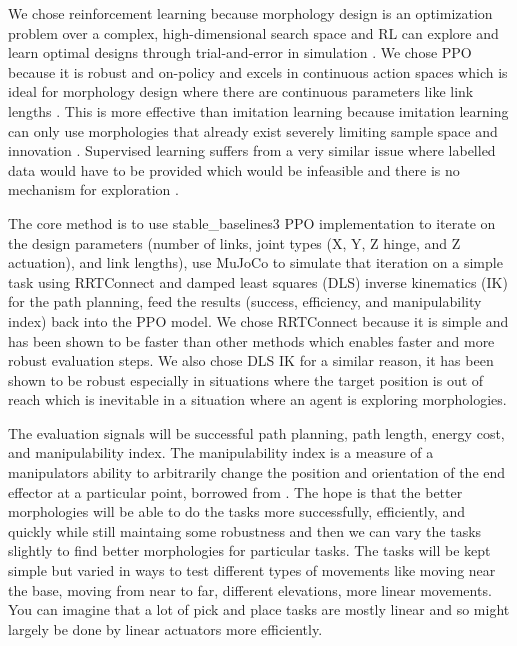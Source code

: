 \documentclass[conference]{IEEEtran}
\begin{document}
We chose reinforcement learning because morphology design is an optimization problem over a complex, high-dimensional search space and RL can explore and learn optimal designs through trial-and-error in simulation \cite{sutton1988learning}.
We chose PPO because it is robust and on-policy and excels in continuous action spaces which is ideal for morphology design where there are continuous parameters like link lengths \cite{schulman2017proximal}.
This is more effective than imitation learning because imitation learning can only use morphologies that already exist severely limiting sample space and innovation \cite{delgado2022robotics}.
Supervised learning suffers from a very similar issue where labelled data would have to be provided which would be infeasible and there is no mechanism for exploration \cite{kober2013reinforcement}.

The core method is to use stable\_baselines3 PPO implementation to iterate on the design parameters (number of links, joint types (X, Y, Z hinge, and Z actuation), and link lengths), use MuJoCo to simulate that iteration on a simple task using RRTConnect and damped least squares (DLS) inverse kinematics (IK) for the path planning, feed the results (success, efficiency, and manipulability index) back into the PPO model.
We chose RRTConnect because it is simple and has been shown to be faster than other methods \cite{844730} which enables faster and more robust evaluation steps.
We also chose DLS IK for a similar reason, it has been shown to be robust especially in situations where the target position is out of reach \cite{buss2004introduction} which is inevitable in a situation where an agent is exploring morphologies.

The evaluation signals will be successful path planning, path length, energy cost, and manipulability index.
The manipulability index is a measure of a manipulators ability to arbitrarily change the position and orientation of the end effector at a particular point, borrowed from \cite{yoshikawa1985manipulability}.
The hope is that the better morphologies will be able to do the tasks more successfully, efficiently, and quickly while still maintaing some robustness and then we can vary the tasks slightly to find better morphologies for particular tasks.
The tasks will be kept simple but varied in ways to test different types of movements like moving near the base, moving from near to far, different elevations, more linear movements.
You can imagine that a lot of pick and place tasks are mostly linear and so might largely be done by linear actuators more efficiently.
\end{document}
